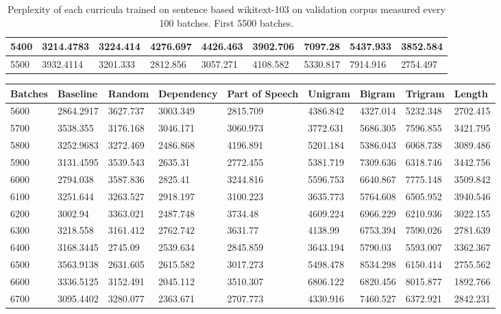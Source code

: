 \documentclass [11pt, proquest] {uwthesis}[2020/12/20]
\begin{document}
\begin{table}[]
\begin{tiny}
\begin{tabular}{|l|l|l|l|l|l|l|l|l|}
5400 & 3214.4783 & 3224.414 & 4276.697 & 4426.463 & 3902.706 & 7097.28 & 5437.933 & 3852.584 \\ \hline
5500 & 3932.4114 & 3201.333 & 2812.856 & 3057.271 & 4108.582 & 5330.817 & 7914.916 & 2754.497 \\ \hline
\end{tabular}
\caption{Perplexity of each curricula trained on sentence based wikitext-103 on validation corpus measured every 100 batches. First 5500 batches.}
\label{tab:wikitext-103-sentence-1}
\end{tiny}
\end{table}
\begin{table}[]
\centering
\begin{tiny}
\begin{tabular}{|l|l|l|l|l|l|l|l|l|}
\hline
Batches & Baseline & Random & Dependency & Part of Speech & Unigram & Bigram & Trigram & Length \\ \hline
5600 & 2864.2917 & 3627.737 & 3003.349 & 2815.709 & 4386.842 & 4327.014 & 5232.348 & 2702.415 \\ \hline
5700 & 3538.355 & 3176.168 & 3046.171 & 3060.973 & 3772.631 & 5686.305 & 7596.855 & 3421.795 \\ \hline
5800 & 3252.9683 & 3272.469 & 2486.868 & 4196.891 & 5201.184 & 5386.043 & 6068.738 & 3089.486 \\ \hline
5900 & 3131.4595 & 3539.543 & 2635.31 & 2772.455 & 5381.719 & 7309.636 & 6318.746 & 3442.756 \\ \hline
6000 & 2794.038 & 3587.836 & 2825.41 & 3244.816 & 5596.753 & 6640.867 & 7775.148 & 3509.842 \\ \hline
6100 & 3251.644 & 3263.527 & 2918.197 & 3100.223 & 3635.773 & 5764.608 & 6505.952 & 3940.546 \\ \hline
6200 & 3002.94 & 3363.021 & 2487.748 & 3734.48 & 4609.224 & 6966.229 & 6210.936 & 3022.155 \\ \hline
6300 & 3218.558 & 3161.412 & 2762.742 & 3631.77 & 4138.99 & 6753.394 & 7590.026 & 2781.639 \\ \hline
6400 & 3168.3445 & 2745.09 & 2539.634 & 2845.859 & 3643.194 & 5790.03 & 5593.007 & 3362.367 \\ \hline
6500 & 3563.9138 & 2631.605 & 2615.582 & 3017.273 & 5498.478 & 8534.298 & 6150.414 & 2755.562 \\ \hline
6600 & 3336.5125 & 3152.491 & 2045.112 & 3510.307 & 6806.122 & 6820.456 & 8015.877 & 1892.766 \\ \hline
6700 & 3095.4402 & 3280.077 & 2363.671 & 2707.773 & 4330.916 & 7460.527 & 6372.921 & 2842.231 \\ \hline

\end{tabular}
\end{tiny}
\end{table}
\end{document}
